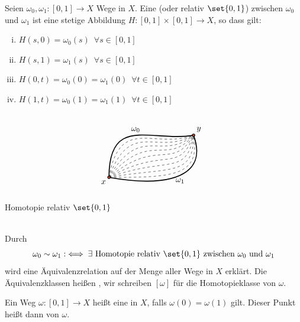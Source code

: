 \begin{definition}[{name=[Homotopie mit festen Endpunkten]}]
	Seien $\omega_0, \omega_1 \colon [0,1] \to X$ Wege in $X$. 
	Eine  (oder relativ $\set{0,1}$) zwischen $\omega_0$ und $\omega_1$ ist eine stetige Abbildung $H \colon [0,1] \times [0,1] \to X$, so dass gilt:\\
	\begin{minipage}[c]{0.45\textwidth}
	\begin{enumerate}[(i)]
		\item $H(s,0)= \omega_0(s) \enspace \forall s \in [0,1]$
		\item $H(s,1) = \omega_1(s) \enspace \forall s \in [0,1]$
		\item $H(0,t) = \omega_0(0)= \omega_1(0) \enspace \forall t \in [0,1]$
		\item $H(1,t) = \omega_0(1) = \omega_1(1) \enspace \forall t \in [0,1]$
	\end{enumerate}	
	\end{minipage} \hfill
	\begin{minipage}[c]{0.45\textwidth}
		\captionsetup{type=figure, skip=1pt}
		\[
			\begin{tikzpicture}[scale=0.9]
				\coordinate (x) at (0,0);
				\coordinate (y) at (4,2);
				\draw[very thick] (x) .. controls +(90:3) and +(190:2) .. (y) node[midway, above]{$\omega_0$};
				\foreach \s / \t in {80/200, 70/210, 60/220, 50/230, 40/240, 30/250 , 20/260, 10/270, 0/280} {
					\draw[dashed] (x) .. controls +(\s:3) and +(\t:2) .. (y);
				}
				\draw[very thick] (x) .. controls +(-10:3) and +(-70:2) .. (y) node[midway, below]{$\omega_1$};
				\draw[thick, fill=Tomato3] (x) circle(0.06) node[below left]{$x$};
				\draw[thick, fill=Tomato3] (y) circle(0.06) node[above right]{$y$};
			\end{tikzpicture}
		\]
		\caption{Homotopie relativ $\set{0,1}$}
	\end{minipage} \smallskip\\
	Durch 
	\[
		\omega_0 \sim \omega_1 :\iff \exists \text{ Homotopie relativ } \set{0,1} \text{ zwischen } \omega_0 \text{ und } \omega_1
	\]
	wird eine Äquivalenzrelation auf der Menge aller Wege in $X$ erklärt. 
	Die Äquivalenzklassen heißen , wir schreiben $[\omega]$ für die Homotopieklasse von $\omega$.
\end{definition}

\begin{definition}[{name=[Schleife]}]
	Ein Weg $\omega \colon [0,1] \to X$ heißt eine  in $X$, falls $\omega(0)= \omega(1)$ gilt. 
	Dieser Punkt heißt dann  von $\omega$. 
\end{definition}

